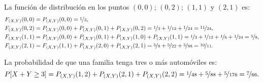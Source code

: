 \begin{ejercicio}
    La función de distribución en los puntos $(0,0)$; $(0,2)$; $(1,1)$ y $(2,1)$ es:
    \begin{align*}
        F_{(X,Y)}(0,0) &= P_{(X,Y)}(0,0) = \nicefrac{1}{3}, \\
        F_{(X,Y)}(0,2) &= P_{(X,Y)}(0,0) + P_{(X,Y)}(0,1) + P_{(X,Y)}(0,2) = \nicefrac{1}{3} + \nicefrac{1}{12} + \nicefrac{1}{24} = \nicefrac{11}{24}, \\
        F_{(X,Y)}(1,1) &= P_{(X,Y)}(0,0) + P_{(X,Y)}(0,1) + P_{(X,Y)}(1,0) + P_{(X,Y)}(1,1) = \nicefrac{1}{3} + \nicefrac{1}{12} + \nicefrac{1}{6} + \nicefrac{1}{24} = \nicefrac{5}{8}, \\
        F_{(X,Y)}(2,1) &= F_{(X,Y)}(1,1) + P_{(X,Y)}(2,0) + P_{(X,Y)}(2,1) = \nicefrac{5}{8} + \nicefrac{5}{22} + \nicefrac{5}{88} = \nicefrac{10}{11}.
    \end{align*}

    La probabilidad de que una familia tenga tres o más automóviles es:
    \begin{equation*}
        P[X+Y \geq 3] = P_{(X,Y)}(1,2) + P_{(X,Y)}(2,1) + P_{(X,Y)}(2,2) = \nicefrac{1}{48} + \nicefrac{5}{88} + \nicefrac{5}{176} = \nicefrac{7}{66}.
    \end{equation*}
\end{ejercicio}

